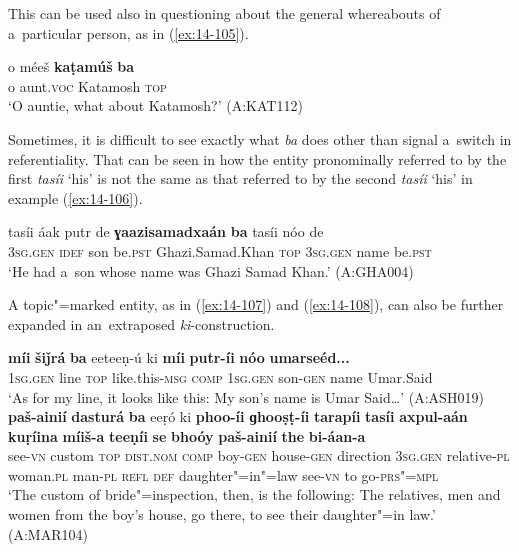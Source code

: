 This can be used also in questioning about the general whereabouts of a~particular person, as in (\ref{ex:14-105}).

\begin{exe}
\ex
\label{ex:14-105}
\gll o méeš \textbf{kaṭamúš} \textbf{ba}\\
o aunt.\textsc{voc} Katamosh \textsc{top}\\
\glt `O auntie, what about Katamosh?' (A:KAT112)
\end{exe}

Sometimes, it is difficult to see exactly what \textit{ba} does other than signal a~switch in referentiality. That can be seen in how the entity pronominally referred to by the first \textit{tasíi} `his' is not the same as that referred to by the second \textit{tasíi} `his' in example (\ref{ex:14-106}).

\begin{exe}
\ex
\label{ex:14-106}
\gll tasíi áak putr de \textbf{ɣaazisamadxaán} \textbf{ba}  tasíi nóo de \\
\textsc{3sg.gen} \textsc{idef} son be.\textsc{pst} Ghazi.Samad.Khan \textsc{top}  \textsc{3sg.gen} name be.\textsc{pst} \\
\glt `He had a~son whose name was Ghazi Samad Khan.' (A:GHA004)
\end{exe}

A topic"=marked entity, as in (\ref{ex:14-107}) and (\ref{ex:14-108}), can also be further expanded in an~extraposed \textit{ki}-construction.

\ea
\label{ex:14-107}
\gll \textbf{míi} \textbf{šiǰrá} \textbf{ba} eeteeṇ-ú ki \textbf{míi} \textbf{putr-íi} \textbf{nóo} \textbf{umarseéd...}\\
\textsc{1sg.gen} line \textsc{top} like.this-\textsc{msg } \textsc{comp} \textsc{1sg.gen} son-\textsc{gen} name Umar.Said\\
\glt `As for my line, it looks like this: My son's name is Umar Said{\ldots}' (A:ASH019) 
\ex
\label{ex:14-108}
\gll \textbf{paš-ainií} \textbf{dasturá} \textbf{ba} eeṛó ki \textbf{phoo-íi} \textbf{ɡhooṣṭ-íi} \textbf{tarapíi} \textbf{tasíi} \textbf{axpul-aán} \textbf{kuṛíina} \textbf{míiš-a} \textbf{teeṇíi} \textbf{se} \textbf{bhoóy} \textbf{paš-ainií} \textbf{the} \textbf{bi-áan-a}\\
see-\textsc{vn} custom \textsc{top} \textsc{dist.nom} \textsc{comp} boy-\textsc{gen} house-\textsc{gen} direction \textsc{3sg.gen} relative-\textsc{pl} woman.\textsc{pl}  man-\textsc{pl} \textsc{refl} \textsc{def} daughter"=in"=law see-\textsc{vn} to go-\textsc{prs"=mpl}\\
\glt `The custom of bride"=inspection, then, is the following: The relatives, men and women from the boy's house, go there, to see their daughter"=in law.' (A:MAR104)
\z

